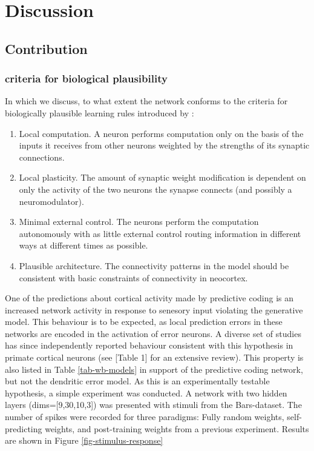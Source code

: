 
\chapter{Discussion}


\section{Contribution}




\subsection{criteria for biological plausibility}

In which we discuss, to what extent the network conforms to the criteria for biologically plausible learning rules
introduced by \cite{Whittington2017}:
\begin{enumerate}
      \item Local computation. A neuron performs computation only on the basis
            of the inputs it receives from other neurons weighted by the strengths
            of its synaptic connections.
      \item  Local plasticity. The amount of synaptic weight modification is dependent on only the activity of the two
            neurons the synapse connects (and possibly a neuromodulator).
      \item  Minimal external control. The neurons perform the computation autonomously with as little external control
            routing information in different ways at different times as possible.
      \item   Plausible architecture. The connectivity patterns in the model should
            be consistent with basic constraints of connectivity in neocortex.
\end{enumerate}




One of the predictions about cortical activity made by predictive coding is an increased network activity in response to
senesory input violating the generative model. This behaviour is to be expected, as local prediction errors in these
networks are encoded in the activation of error neurons. A diverse set of studies has since independently reported
behaviour consistent with this hypothesis in primate cortical neurons (see \citep{bastos2012canonical}[Table 1] for an
extensive review). This property is also listed in Table \ref{tab-wb-models} in support of the predictive coding
network, but not the dendritic error model. As this is an experimentally testable hypothesis, a simple experiment was
conducted. A network with two hidden layers (dims=[9,30,10,3]) was presented with stimuli from the Bars-dataset. The
number of spikes were recorded for three paradigms: Fully random weights, self-predicting weights, and post-training
weights from a previous experiment. Results are shown in Figure \ref{fig-stimulus-response}




